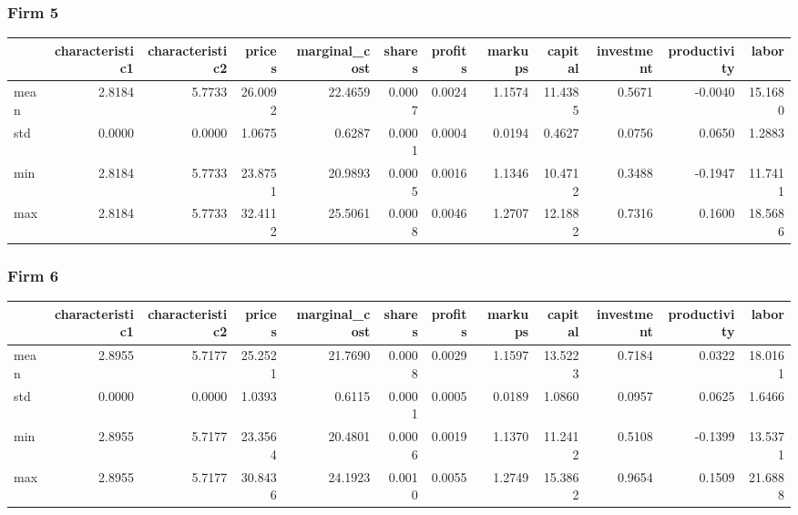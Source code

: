  \subsubsection*{Firm 5}
\begin{tabular}{lrrrrrrrrrrr}
\toprule
{} &  characteristic1 &  characteristic2 &  prices &  marginal\_cost &  shares &  profits &  markups &  capital &  investment &  productivity &   labor \\
\midrule
mean &           2.8184 &           5.7733 & 26.0092 &        22.4659 &  0.0007 &   0.0024 &   1.1574 &  11.4385 &      0.5671 &       -0.0040 & 15.1680 \\
std  &           0.0000 &           0.0000 &  1.0675 &         0.6287 &  0.0001 &   0.0004 &   0.0194 &   0.4627 &      0.0756 &        0.0650 &  1.2883 \\
min  &           2.8184 &           5.7733 & 23.8751 &        20.9893 &  0.0005 &   0.0016 &   1.1346 &  10.4712 &      0.3488 &       -0.1947 & 11.7411 \\
max  &           2.8184 &           5.7733 & 32.4112 &        25.5061 &  0.0008 &   0.0046 &   1.2707 &  12.1882 &      0.7316 &        0.1600 & 18.5686 \\
\bottomrule
\end{tabular}


 \subsubsection*{Firm 6}
\begin{tabular}{lrrrrrrrrrrr}
\toprule
{} &  characteristic1 &  characteristic2 &  prices &  marginal\_cost &  shares &  profits &  markups &  capital &  investment &  productivity &   labor \\
\midrule
mean &           2.8955 &           5.7177 & 25.2521 &        21.7690 &  0.0008 &   0.0029 &   1.1597 &  13.5223 &      0.7184 &        0.0322 & 18.0161 \\
std  &           0.0000 &           0.0000 &  1.0393 &         0.6115 &  0.0001 &   0.0005 &   0.0189 &   1.0860 &      0.0957 &        0.0625 &  1.6466 \\
min  &           2.8955 &           5.7177 & 23.3564 &        20.4801 &  0.0006 &   0.0019 &   1.1370 &  11.2412 &      0.5108 &       -0.1399 & 13.5371 \\
max  &           2.8955 &           5.7177 & 30.8436 &        24.1923 &  0.0010 &   0.0055 &   1.2749 &  15.3862 &      0.9654 &        0.1509 & 21.6888 \\
\bottomrule
\end{tabular}



